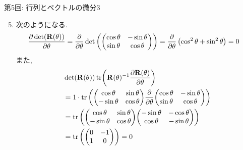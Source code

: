 \documentclass[dvipdfmx,notheorems,t]{beamer}
\begin{document}
\begin{frame}{第5回: 行列とベクトルの微分3}
\begin{enumerate}
  \setcounter{enumi}{4}
  \item 次のようになる.
  {\small \begin{align*}
    \pdv{\det(\vb{R}(\theta))}{\theta}
      &= \pdv{\theta} \det \left( \mqty(\cos \theta & -\sin \theta \\ \sin \theta & \cos \theta) \right)
      = \pdv{\theta} \left( \cos^2 \theta + \sin^2 \theta \right) = 0
  \end{align*}}
  また,
  {\small \begin{align*}
    & \det(\vb{R}(\theta)) \tr(\vb{R}(\theta)^{-1} \pdv{\vb{R}(\theta)}{\theta}) \\
      &= 1 \cdot \tr \left( \mqty(\cos \theta & \sin \theta \\ -\sin \theta & \cos \theta)
        \pdv{\theta} \mqty(\cos \theta & -\sin \theta \\ \sin \theta & \cos \theta) \right) \\
      &= \tr \left( \mqty(\cos \theta & \sin \theta \\ -\sin \theta & \cos \theta)
        \mqty(-\sin \theta & -\cos \theta \\ \cos \theta & -\sin \theta) \right) \\
      &= \tr \left( \mqty(0 & -1 \\ 1 & 0) \right) = 0
  \end{align*}}
\end{enumerate}
\end{frame}
\end{document}
